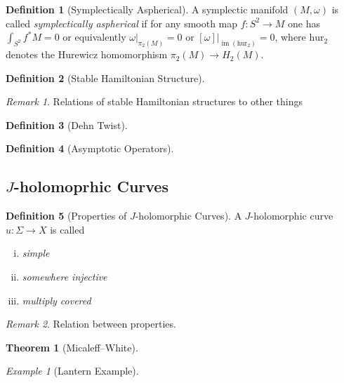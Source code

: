 \documentclass[a4paper]{article}
\newcommand{\si}{\Sigma}
\newcommand{\lra}{\longrightarrow}
\theoremstyle{definition}
\newtheorem{thm}{Theorem}
\theoremstyle{definition}
\newtheorem{definition}{Definition}
\theoremstyle{remark}
\newtheorem{rmk}{Remark}
\theoremstyle{remark}
\theoremstyle{remark}
\newtheorem{ex}{Example}
\begin{document}
\begin{definition}[Symplectically Aspherical]
  A symplectic manifold $(M,\omega)$ is called \emph{symplectically aspherical} if for any smooth map $f:S^2\lra M$ one has $\int_{S^2}f^*M=0$ or equivalently $\omega|_{\pi_2(M)}=0$ or $[\omega]|_{\operatorname{im}(\text{hur}_2)}=0$, where $\text{hur}_2$ denotes the Hurewicz homomorphism $\pi_2(M)\lra H_2(M)$.
\end{definition}

\begin{definition}[Stable Hamiltonian Structure]
  
\end{definition}

\begin{rmk}
  Relations of stable Hamiltonian structures to other things
\end{rmk}

\begin{definition}[Dehn Twist]
  
\end{definition}

\begin{definition}[Asymptotic Operators]
  
\end{definition}

\subsection{$J$-holomoprhic Curves}

\begin{definition}[Properties of $J$-holomorphic Curves]
A $J$-holomorphic curve $u:\si\lra X$ is called
  \begin{enumerate}[(i)]
    \item \emph{simple}
    \item \emph{somewhere injective}
    \item \emph{multiply covered}
  \end{enumerate}
\end{definition}

\begin{rmk}
  Relation between properties.
\end{rmk}

\begin{thm}[Micaleff--White]
  
\end{thm}

\begin{ex}[Lantern Example]
  
\end{ex}
\end{document}
